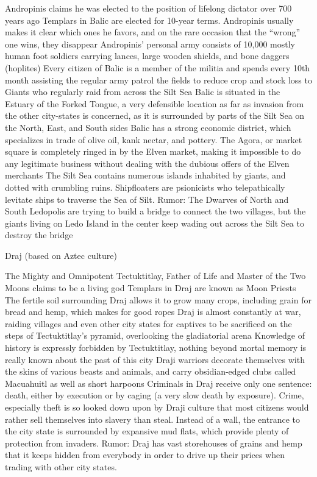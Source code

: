     Andropinis claims he was elected to the position of lifelong dictator over 700 years ago
    Templars in Balic are elected for 10-year terms. Andropinis usually makes it clear which ones he favors, and on the rare occasion that the “wrong” one wins, they disappear
    Andropinis’ personal army consists of 10,000 mostly human foot soldiers carrying lances, large wooden shields, and bone daggers (hoplites)
    Every citizen of Balic is a member of the militia and spends every 10th month assisting the regular army patrol the fields to reduce crop and stock loss to Giants who regularly raid from across the Silt Sea
    Balic is situated in the Estuary of the Forked Tongue, a very defensible location as far as invasion from the other city-states is concerned, as it is surrounded by parts of the Silt Sea on the North, East, and South sides
    Balic has a strong economic district, which specializes in trade of olive oil, kank nectar, and pottery.
    The Agora, or market square is completely ringed in by the Elven market, making it impossible to do any legitimate business without dealing with the dubious offers of the Elven merchants
    The Silt Sea contains numerous islands inhabited by giants, and dotted with crumbling ruins.
    Shipfloaters are psionicists who telepathically levitate ships to traverse the Sea of Silt.
    Rumor: The Dwarves of North and South Ledopolis are trying to build a bridge to connect the two villages, but the giants living on Ledo Island in the center keep wading out across the Silt Sea to destroy the bridge

Draj (based on Aztec culture)

    The Mighty and Omnipotent Tectuktitlay, Father of Life and Master of the Two Moons claims to be a living god
    Templars in Draj are known as Moon Priests
    The fertile soil surrounding Draj allows it to grow many crops, including grain for bread and hemp, which makes for good ropes
    Draj is almost constantly at war, raiding villages and even other city states for captives to be sacrificed on the steps of Tectuktitlay’s pyramid, overlooking the gladiatorial arena
    Knowledge of history is expressly forbidden by Tectuktitlay, nothing beyond mortal memory is really known about the past of this city
    Draji warriors decorate themselves with the skins of various beasts and animals, and carry obsidian-edged clubs called Macuahuitl as well as short harpoons
    Criminals in Draj receive only one sentence: death, either by execution or by caging (a very slow death by exposure).
    Crime, especially theft is so looked down upon by Draji culture that most citizens would rather sell themselves into slavery than steal.
    Instead of a wall, the entrance to the city state is surrounded by expansive mud flats, which provide plenty of protection from invaders.
    Rumor: Draj has vast storehouses of grains and hemp that it keeps hidden from everybody in order to drive up their prices when trading with other city states.

